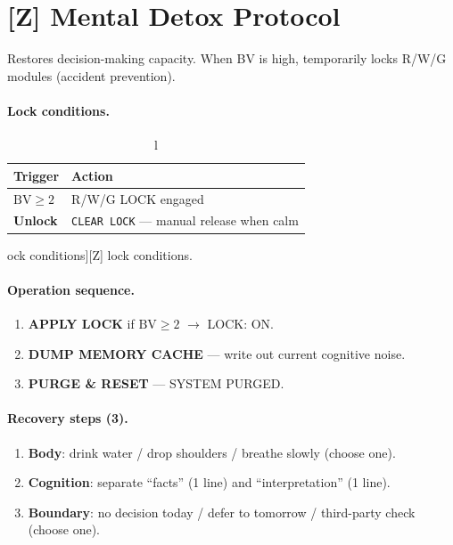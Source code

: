 \section{[Z] Mental Detox Protocol}
\label{sec:secretary-Z}

Restores decision-making capacity. When BV is high, temporarily
locks R/W/G modules (accident prevention).

\paragraph{Lock conditions.}

\begin{table}[ht]
\centering
\small
\begin{tabularx}{0.85\linewidth}{lX}
\toprule
\textbf{Trigger} & \textbf{Action} \\
\midrule
$\mathrm{BV} \ge 2$ & R/W/G LOCK engaged \\
\textbf{Unlock} & \texttt{CLEAR LOCK} --- manual release when calm \\
\bottomrule
\end{tabularx}
\caption[\,[Z] lock conditions]{[Z] lock conditions.}
\label{tab:Z-lock}
\end{table}

\paragraph{Operation sequence.}

\begin{enumerate}
\item \textbf{APPLY LOCK} if $\mathrm{BV} \ge 2$ $\to$ LOCK: ON.
\item \textbf{DUMP MEMORY CACHE} --- write out current cognitive
noise.
\item \textbf{PURGE \& RESET} --- SYSTEM PURGED.
\end{enumerate}

\paragraph{Recovery steps (3).}

\begin{enumerate}
\item \textbf{Body}: drink water / drop shoulders / breathe slowly
(choose one).
\item \textbf{Cognition}: separate ``facts'' (1 line) and
``interpretation'' (1 line).
\item \textbf{Boundary}: no decision today / defer to tomorrow /
third-party check (choose one).
\end{enumerate}

